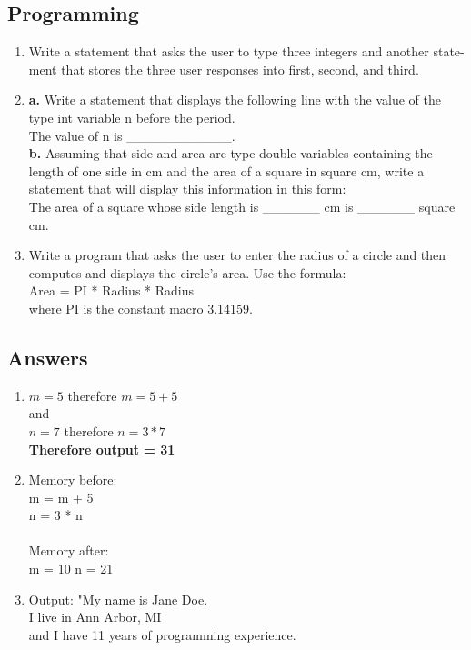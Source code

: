 \documentclass[12pt, letterpaper]{report}
\begin{document}
\subsection*{Programming}
\begin{enumerate}
	\item Write a statement that asks the user to type three integers and another state-
		ment that stores the three user responses into first, second, and third.
	\item \textbf{a.} Write a statement that displays the following line with the value of the
		type int variable n before the period.\\
		The value of n is \_\_\_\_\_\_\_\_\_\_\_.\\
		\textbf{b.} Assuming that side and area are type double variables containing the
		length of one side in cm and the area of a square in square cm, write a
		statement that will display this information in this form:\\
		The area of a square whose side length is \_\_\_\_\_\_ cm
		is \_\_\_\_\_\_ square cm.
	\item Write a program that asks the user to enter the radius of a circle and then
		computes and displays the circle’s area. Use the formula:\\
		Area = PI *  Radius * Radius\\
		where PI is the constant macro 3.14159.\\
\end{enumerate}

\subsection*{Answers}
\begin{enumerate}
	\item $ m = 5 $ therefore $ m = 5 + 5 $\\
			and\\
			$ n = 7 $ therefore $ n = 3 * 7 $\\
			\textbf{Therefore output = 31}
		\item Memory before: \\
				m = m + 5\\
				n = 3 * n\\\\

				Memory after:\\
				m = 10
				n = 21
			\item Output: "My name is Jane Doe.\\
							I live in Ann Arbor, MI\\
							and I have 11 years of programming experience.\\
\end{enumerate}
\end{document}
